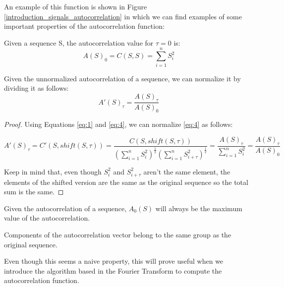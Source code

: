 An example of this function is shown in Figure
\ref{introduction_signals_autocorrelation} in which we can find examples of
some important properties of the autocorrelation function:

\begin{theorem}\label{theorem:1.2.1}
  Given a sequence S, the autocorrelation value for $\tau = 0$ is:
    \begin{equation}
      A(S)_{0}=C(S, S)=\sum_{i=1}^{n}S_{i}^2
    \end{equation}
\end{theorem}

\begin{corollary}
  Given the unnormalized autocorrelation of a sequence, we can
  normalize it by dividing it as follows:
  \begin{equation}
    A'(S)_{\tau} = \frac{A(S)_{\tau}}{A(S)_{0}}
  \end{equation}
\end{corollary}

\begin{proof}
  Using Equations \ref{eq:1} and \ref{eq:4}, we can normalize \ref{eq:4} as
  follows:

    $$A'(S)_{\tau} = C'(S, shift(S, \tau)) = \frac{C(S, shift(S, \tau))}{(\sum_{i=1}^{n} S_{i}^{2})^{\frac{1}{2}}(\sum_{i=1}^{n} S_{i+\tau}^{2})^\frac{1}{2}} = \frac{A(S)_{\tau}}{\sum_{i=1}^{n} S_{i}^{2}} = \frac{A(S)_{\tau}}{A(S)_{0}}$$

  Keep in mind that, even though $S_{i}^2$ and $S_{i+\tau}^2$ aren't the same element, the elements of the shifted version are the same as the original sequence so the total sum is the same.
\end{proof}

\begin{corollary}\label{autocorrelation:coro:1}
  Given the autocorrelation of a sequence, $A_{0}(S)$ will always be the maximum value of the autocorrelation.
\end{corollary}

\begin{property}
 Components of the autocorrelation vector belong to the same group as the
  original sequence.
\end{property}

Even though this seems a naive property, this will prove
useful when we introduce the algorithm based in the Fourier Transform to
compute the autocorrelation function.









